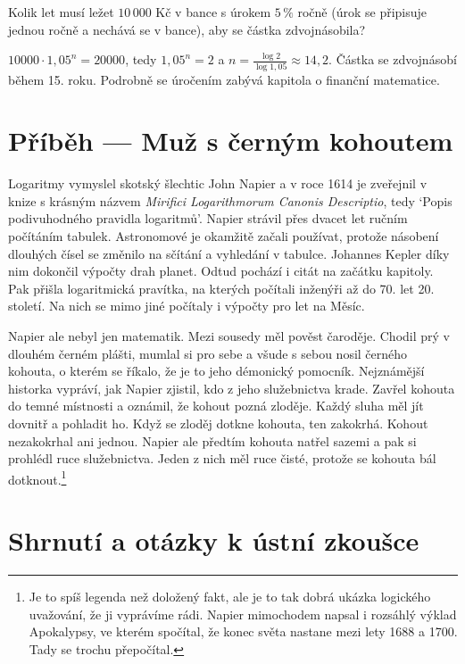 \begin{problem}
  Kolik let musí ležet $10\,000$ Kč v bance s úrokem $5\,\%$ ročně (úrok se připisuje jednou ročně a nechává se v bance), aby se částka zdvojnásobila?
\end{problem}

\begin{solution}
  $10000\cdot 1{,}05^n = 20000$, tedy $1{,}05^n = 2$ a $n = \frac{\log 2}{\log 1{,}05}\approx 14{,}2$. Částka se zdvojnásobí během 15. roku. Podrobně se úročením zabývá kapitola o finanční matematice.
\end{solution}

\section{Příběh --- Muž s černým kohoutem}

Logaritmy vymyslel skotský šlechtic John Napier a v roce 1614 je zveřejnil v knize s krásným názvem \textit{Mirifici Logarithmorum Canonis Descriptio}, tedy `Popis podivuhodného pravidla logaritmů'. Napier strávil přes dvacet let ručním počítáním tabulek. Astronomové je okamžitě začali používat, protože násobení dlouhých čísel se změnilo na sčítání a vyhledání v tabulce. Johannes Kepler díky nim dokončil výpočty drah planet. Odtud pochází i citát na začátku kapitoly. Pak přišla logaritmická pravítka, na kterých počítali inženýři až do 70. let 20. století. Na nich se mimo jiné počítaly i výpočty pro let na Měsíc.

Napier ale nebyl jen matematik. Mezi sousedy měl pověst čaroděje. Chodil prý v dlouhém černém plášti, mumlal si pro sebe a všude s sebou nosil černého kohouta, o kterém se říkalo, že je to jeho démonický pomocník. Nejznámější historka vypráví, jak Napier zjistil, kdo z jeho služebnictva krade. Zavřel kohouta do temné místnosti a oznámil, že kohout pozná zloděje. Každý sluha měl jít dovnitř a pohladit ho. Když se zloděj dotkne kohouta, ten zakokrhá. Kohout nezakokrhal ani jednou. Napier ale předtím kohouta natřel sazemi a pak si prohlédl ruce služebnictva. Jeden z nich měl ruce čisté, protože se kohouta bál dotknout.\footnote{Je to spíš legenda než doložený fakt, ale je to tak dobrá ukázka logického uvažování, že ji vyprávíme rádi. Napier mimochodem napsal i rozsáhlý výklad Apokalypsy, ve kterém spočítal, že konec světa nastane mezi lety 1688 a 1700. Tady se trochu přepočítal.}

\section{Shrnutí a otázky k ústní zkoušce}

